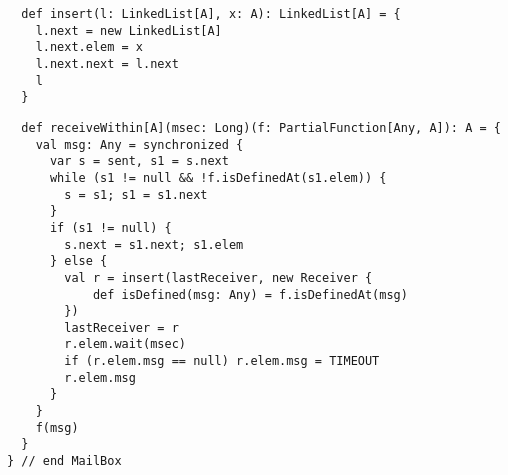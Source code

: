 \begin{lstlisting}
  def insert(l: LinkedList[A], x: A): LinkedList[A] = {
    l.next = new LinkedList[A]
    l.next.elem = x
    l.next.next = l.next
    l
  }
\end{lstlisting}
\begin{lstlisting}
  def receiveWithin[A](msec: Long)(f: PartialFunction[Any, A]): A = {
    val msg: Any = synchronized {
      var s = sent, s1 = s.next
      while (s1 != null && !f.isDefinedAt(s1.elem)) {
        s = s1; s1 = s1.next 
      }
      if (s1 != null) {
        s.next = s1.next; s1.elem
      } else {
        val r = insert(lastReceiver, new Receiver {
            def isDefined(msg: Any) = f.isDefinedAt(msg)
        })
        lastReceiver = r
        r.elem.wait(msec)
        if (r.elem.msg == null) r.elem.msg = TIMEOUT
        r.elem.msg
      }
    }
    f(msg)
  }
} // end MailBox
\end{lstlisting}



